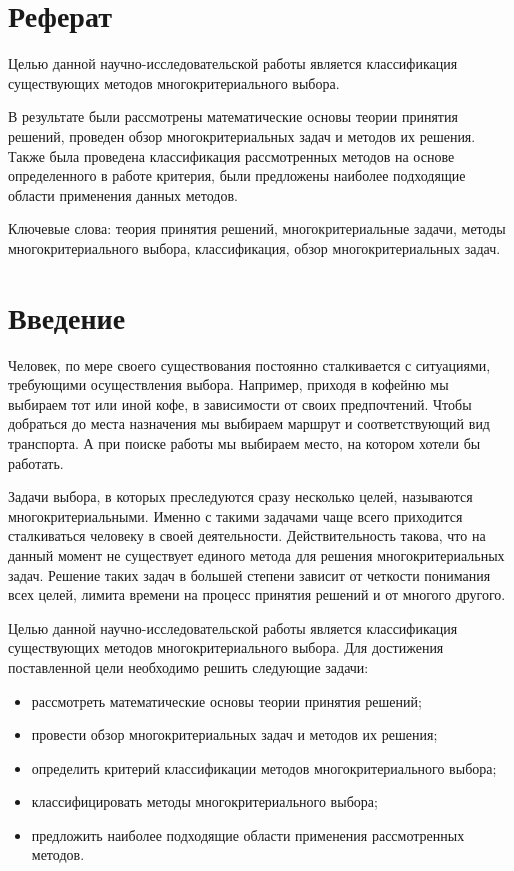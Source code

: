 
\chapter*{Реферат}

Целью данной научно-исследовательской работы является классификация существующих методов многокритериального выбора.

В результате были рассмотрены математические основы теории принятия решений, проведен обзор многокритериальных задач и методов их решения. Также была проведена классификация рассмотренных методов на основе определенного в работе критерия, были предложены наиболее подходящие области применения данных методов.

Ключевые слова: теория принятия решений, многокритериальные задачи, методы многокритериального выбора, классификация, обзор многокритериальных задач.

\newpage

\chapter*{Введение}

Человек, по мере своего существования постоянно сталкивается с ситуациями, требующими осуществления выбора. Например, приходя в кофейню мы выбираем тот или иной кофе, в зависимости от своих предпочтений. Чтобы добраться до места назначения мы выбираем маршрут и соответствующий вид транспорта. А при поиске работы мы выбираем место, на котором хотели бы работать.

Задачи выбора, в которых преследуются сразу несколько целей, называются многокритериальными. Именно с такими задачами чаще всего приходится сталкиваться человеку в своей деятельности. Действительность такова, что на данный момент не существует единого метода для решения многокритериальных задач. Решение таких задач в большей степени зависит от четкости понимания всех целей, лимита времени на процесс принятия решений и от многого другого. \cite{bib1}

Целью данной научно-исследовательской работы является классификация существующих методов многокритериального выбора. Для достижения поставленной цели необходимо решить следующие задачи:
\begin{itemize}[label=--]
    \item рассмотреть математические основы теории принятия решений;
    \item провести обзор многокритериальных задач и методов их решения;
    \item определить критерий классификации методов многокритериального выбора;
    \item классифицировать методы многокритериального выбора;
    \item предложить наиболее подходящие области применения рассмотренных методов.
\end{itemize}